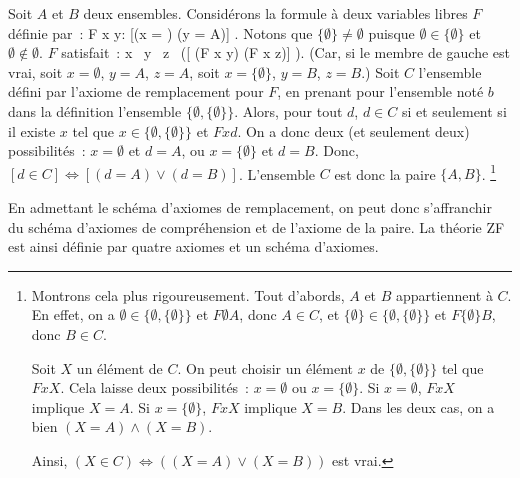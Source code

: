 Soit $A$ et $B$ deux ensembles. 
Considérons la formule à deux variables libres $F$ définie par : 
\startformula
    F x y: [(x = \emptyset) \wedge (y = A)] \vee [(x = \lbrace \emptyset \rbrace) \wedge (y = B)].
\stopformula
Notons que $\lbrace \emptyset \rbrace \neq \emptyset$ puisque $\emptyset \in \lbrace \emptyset \rbrace$ et $\emptyset \notin \emptyset$. 
$F$ satisfait : 
\startformula
    \forall x \, \forall y \, \forall z \, ([ (F x y) \wedge (F x z)] \Rightarrow [y = z] ).
\stopformula
(Car, si le membre de gauche est vrai, soit $x = \emptyset$, $y = A$, $z = A$, soit $x = \lbrace \emptyset \rbrace$, $y = B$, $z = B$.)
Soit $C$ l'ensemble défini par l'axiome de remplacement pour $F$, en prenant pour l'ensemble noté $b$ dans la définition l'ensemble $\lbrace \emptyset, \lbrace \emptyset \rbrace \rbrace$. 
Alors, pour tout $d$, $d \in C$ si et seulement si il existe $x$ tel que $x \in \lbrace \emptyset, \lbrace \emptyset \rbrace \rbrace$ et $F x d$. 
On a donc deux (et seulement deux) possibilités : $x = \emptyset$ et $d = A$, ou $x = \lbrace \emptyset \rbrace$ et $d = B$. 
Donc, $[d \in C] \Leftrightarrow [(d = A) \vee (d = B)]$.
L'ensemble $C$ est donc la paire $\lbrace A, B \rbrace$.%
\footnote{
    Montrons cela plus rigoureusement. 
    Tout d'abords, $A$ et $B$ appartiennent à $C$. 
    En effet, on a $\emptyset \in \lbrace \emptyset, \lbrace \emptyset \rbrace \rbrace$ et $F \emptyset A$, donc $A \in C$, et $\lbrace \emptyset \rbrace \in \lbrace \emptyset, \lbrace \emptyset \rbrace \rbrace$ et $F \lbrace \emptyset \rbrace B$, donc $B \in C$.
    
    Soit $X$ un élément de $C$. 
    On peut choisir un élément $x$ de $\lbrace \emptyset, \lbrace \emptyset \rbrace \rbrace$ tel que $F x X$. 
    Cela laisse deux possibilités : $x = \emptyset$ ou $x = \lbrace \emptyset \rbrace$. 
    Si $x = \emptyset$, $F x X$ implique $X = A$.
    Si $x = \lbrace \emptyset \rbrace $, $F x X$ implique $X = B$. 
    Dans les deux cas, on a bien $(X = A) \wedge (X = B)$. 

    Ainsi, $(X \in C) \Leftrightarrow ((X = A) \vee (X = B))$ est vrai.
}

\hfill\square

\blank[medium]

En admettant le schéma d'axiomes de remplacement, on peut donc s'affranchir du schéma d'axiomes de compréhension et de l'axiome de la paire. 
La théorie ZF est ainsi définie par quatre axiomes et un schéma d'axiomes. 

\stopsubsection

